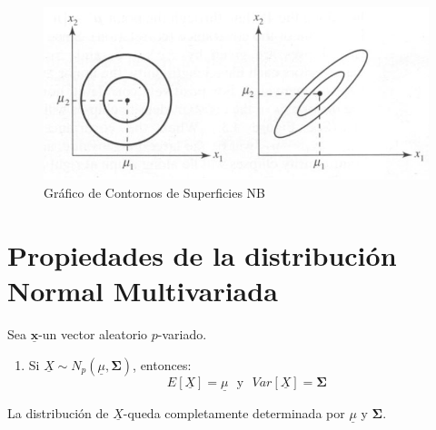 \documentclass[
]{book}
\providecommand{\tightlist}{%
  \setlength{\itemsep}{0pt}\setlength{\parskip}{0pt}}
\theoremstyle{definition}
\theoremstyle{definition}
\theoremstyle{definition}
\theoremstyle{definition}
\theoremstyle{remark}
\begin{document}
\begin{figure}

{\centering \includegraphics[width=0.65\linewidth]{imagenes/graf9} 

}

\caption{Gráfico de Contornos de Superficies NB}\label{fig:contornos-superficies-NB}
\end{figure}

\hypertarget{propiedades-de-la-distribuciuxf3n-normal-multivariada}{%
\section{Propiedades de la distribución Normal Multivariada}\label{propiedades-de-la-distribuciuxf3n-normal-multivariada}}

Sea \(\underline{\mathbf{x}}\)-un vector aleatorio \(p\)-variado.

\begin{enumerate}
\def\labelenumi{\arabic{enumi}.}
\tightlist
\item
  Si \(\underline{X}\sim N_p(\underline{\mu},\mathbf{\Sigma})\), entonces:
  \begin{equation}
  E[\underline{X}]=\underline{\mu} \  \ \ \text{y}\ \ \ Var[\underline{X}]=\mathbf{\Sigma}
  \label{eq:prop-1}
  \end{equation}
\end{enumerate}

La distribución de \(\underline{X}\)-queda completamente determinada por \(\underline{\mu}\) y \(\mathbf{\Sigma}\).
\end{document}
